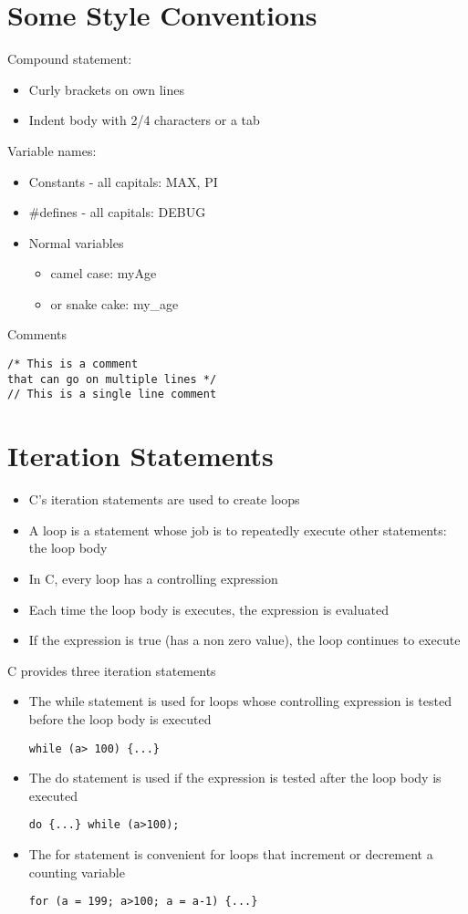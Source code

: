 \documentclass{article}[18pt]
\begin{document}
\section{Some Style Conventions}
Compound statement:
\begin{itemize}
	\item Curly brackets on own lines
	\item Indent body with 2/4 characters or a tab
\end{itemize}
Variable names:
\begin{itemize}
	\item Constants - all capitals: MAX, PI
	\item \#defines - all capitals: DEBUG
	\item Normal variables
	\begin{itemize}
		\item camel case: myAge
		\item or snake cake: my\_age
	\end{itemize}
\end{itemize}
Comments
\begin{verbatim}
/* This is a comment
that can go on multiple lines */
// This is a single line comment
\end{verbatim}
\section{Iteration Statements}
\begin{itemize}
	\item C's iteration statements are used to create loops
	\item A loop is a statement whose job is to repeatedly execute other statements: the loop body
	\item In C, every loop has a controlling expression
	\item Each time the loop body is executes, the expression is evaluated
	\item If the expression is true (has a non zero value), the loop continues to execute
\end{itemize}
C provides three iteration statements
\begin{itemize}
	\item The while statement is used for loops whose controlling expression is tested before the loop body is executed
	\begin{verbatim}
while (a> 100) {...}
	\end{verbatim}
	\item The do statement is used if the expression is tested after the loop body is executed
\begin{verbatim}
do {...} while (a>100);
\end{verbatim}
	\item The for statement is convenient for loops that increment or decrement a counting variable
\begin{verbatim}
for (a = 199; a>100; a = a-1) {...}
\end{verbatim}
\end{itemize}
\end{document}
